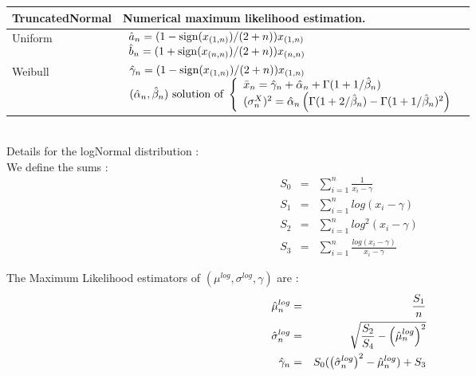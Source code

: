 {  \begin{tabular}{|l|p{12cm}|}
    \hline
    TruncatedNormal & Numerical maximum likelihood estimation. \\
    \hline
    Uniform & $\begin{array}{l}
      \displaystyle\Hat{a}_n=(1-\mathrm{sign}(x_{(1,n)})/(2+n))x_{(1,n)}\\
      \displaystyle\Hat{b}_n=(1+\mathrm{sign}(x_{(n,n)})/(2+n))x_{(n,n)}
    \end{array}$\\
    \hline
    Weibull & $\begin{array}{l}
      \displaystyle\Hat{\gamma}_n = (1-\mathrm{sign}(x_{(1,n)})/(2+n))x_{(1,n)}\\
      (\Hat{\alpha}_n,\Hat{\beta}_n)\mbox{ solution of }\left\{\begin{array}{l}
          \bar{x}_n=\Hat{\gamma}_n+\Hat{\alpha}_n+\Gamma(1+1/\Hat{\beta}_n)\\
          (\sigma_n^X)^2=\Hat{\alpha}_n\left(\Gamma(1+2/\Hat{\beta}_n)-\Gamma(1+1/\Hat{\beta}_n)^2\right)
        \end{array}\right.
    \end{array}$\\
    \hline
  \end{tabular}\rule{0pt}{1em}\\


  Details for the logNormal distribution : \\

  We define the sums :
  \begin{eqnarray}
    \displaystyle S_0 & = & \sum_{i=1}^n \frac{1}{x_i - \gamma} \nonumber \\
    \displaystyle S_1 & = & \sum_{i=1}^n log(x_i - \gamma)  \nonumber \\
    \displaystyle S_2 &  = & \sum_{i=1}^n log^2(x_i - \gamma)  \nonumber \\
    \displaystyle S_3 & = & \sum_{i=1}^n \frac{log(x_i - \gamma)}{x_i - \gamma} \nonumber
  \end{eqnarray}

  The Maximum Likelihood estimators of $(\mu^{log}, \sigma^{log}, \gamma)$ are :
  \begin{eqnarray}
    \displaystyle\Hat{\mu}^{log}_n & = & \frac{S_1}{n}  \label{MLEMu3} \\
    \displaystyle\Hat{\sigma}^{log}_n & = & \sqrt{\frac{S_2}{S_4} - \left(\Hat{\mu}^{log}_n\right)^2}  \label{MLESigma3}\\
    \displaystyle \Hat{\gamma}_n &  = & S_0(\left(\Hat{\sigma}^{log}_n\right)^2 - \Hat{\mu}^{log}_n) + S_3
  \end{eqnarray}

}
